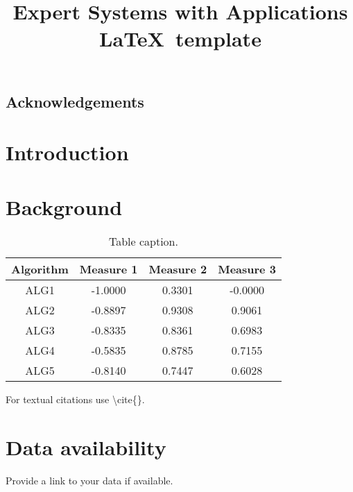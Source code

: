 \documentclass[review]{elsarticle}
\begin{document}
\begin{frontmatter}
\newpage

\section*{Acknowledgements}

\newpage

\tableofcontents

\newpage

\title{Expert Systems with Applications \LaTeX\ template}

\begin{abstract}

\end{abstract}

\begin{keyword}

\end{keyword}

\end{frontmatter}

\section{Introduction}
\label{introduction}


\section{Background}
\label{background}


\begin{table}[H]
\caption{Table caption.}
\centering
\begin{tabular}{|c|ccc|}
\hline
Algorithm & Measure 1 & Measure 2 & Measure 3 \\ \hline
ALG1 &-1.0000&0.3301&-0.0000 \\ \hline
ALG2 & -0.8897 &0.9308&0.9061 \\ \hline
ALG3 & -0.8335&0.8361&0.6983 \\ \hline
ALG4 & -0.5835&0.8785&0.7155 \\ \hline
ALG5 & -0.8140&0.7447&0.6028 \\ \hline
\end{tabular}

\end{table}

For textual citations use \textbackslash cite\{\}. \cite{art}

\section*{Data availability}
Provide a link to your data if available.


\end{document}
